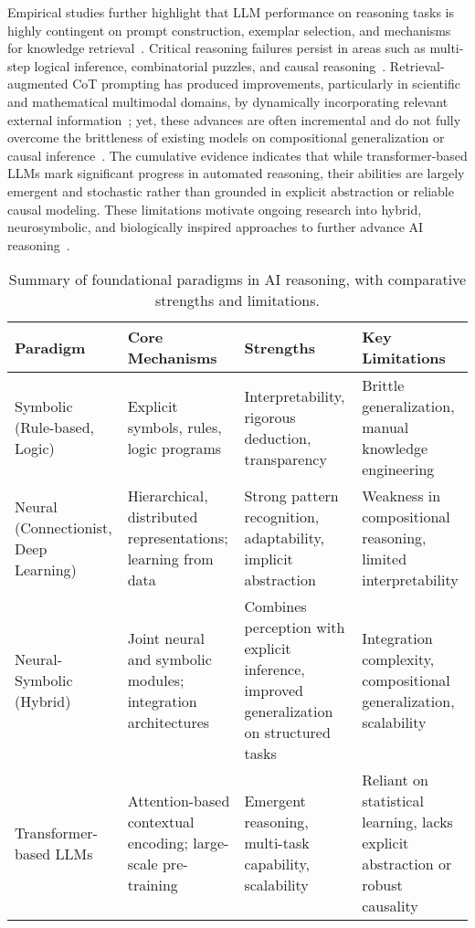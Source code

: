 \documentclass[sigconf]{acmart}
\begin{document}
Empirical studies further highlight that LLM performance on reasoning tasks is highly contingent on prompt construction, exemplar selection, and mechanisms for knowledge retrieval~\cite{ref1,ref5,ref10,ref19,ref11}. Critical reasoning failures persist in areas such as multi-step logical inference, combinatorial puzzles, and causal reasoning~\cite{ref1,ref10,ref19}. Retrieval-augmented CoT prompting has produced improvements, particularly in scientific and mathematical multimodal domains, by dynamically incorporating relevant external information~\cite{ref5,ref11,ref42}; yet, these advances are often incremental and do not fully overcome the brittleness of existing models on compositional generalization or causal inference~\cite{ref43,ref44,ref70,ref86}. The cumulative evidence indicates that while transformer-based LLMs mark significant progress in automated reasoning, their abilities are largely emergent and stochastic rather than grounded in explicit abstraction or reliable causal modeling. These limitations motivate ongoing research into hybrid, neurosymbolic, and biologically inspired approaches to further advance AI reasoning~\cite{ref42,ref49,ref86}.

\begin{table*}[htbp]
\centering
\caption{Summary of foundational paradigms in AI reasoning, with comparative strengths and limitations.}
\label{tab:paradigm_comparison}
\begin{adjustbox}{max width=\textwidth}
\begin{tabular}{@{}llll@{}}
\toprule
\textbf{Paradigm} & \textbf{Core Mechanisms} & \textbf{Strengths} & \textbf{Key Limitations} \\
\midrule
Symbolic (Rule-based, Logic) & Explicit symbols, rules, logic programs & Interpretability, rigorous deduction, transparency & Brittle generalization, manual knowledge engineering \\
Neural (Connectionist, Deep Learning) & Hierarchical, distributed representations; learning from data & Strong pattern recognition, adaptability, implicit abstraction & Weakness in compositional reasoning, limited interpretability \\
Neural-Symbolic (Hybrid) & Joint neural and symbolic modules; integration architectures & Combines perception with explicit inference, improved generalization on structured tasks & Integration complexity, compositional generalization, scalability \\
Transformer-based LLMs & Attention-based contextual encoding; large-scale pre-training & Emergent reasoning, multi-task capability, scalability & Reliant on statistical learning, lacks explicit abstraction or robust causality \\
\bottomrule
\end{tabular}
\end{adjustbox}
\end{table*}
\end{document}
